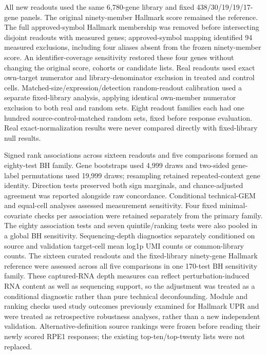 \documentclass[a4paper,fleqn]{cas-sc}
\makeatletter
\DeclareRobustCommand{\rev}[1]{{\color{red}\def\@citecolor{black}\def\@linkcolor{red}\def\@urlcolor{red}#1}}
\makeatother
\begin{document}
\rev{All new readouts used the same 6,780-gene library and fixed 438/30/19/19/17-gene panels.} \rev{The original ninety-member Hallmark score remained the reference.} \rev{The full approved-symbol Hallmark membership was removed before intersecting disjoint readouts with measured genes; approved-symbol mapping identified 94 measured exclusions, including four aliases absent from the frozen ninety-member score.} \rev{An identifier-coverage sensitivity restored these four genes without changing the original score, cohorts or candidate lists.} \rev{Real readouts used exact own-target numerator and library-denominator exclusion in treated and control cells.} \rev{Matched-size/expression/detection random-readout calibration used a separate fixed-library analysis, applying identical own-member numerator exclusion to both real and random sets.} \rev{Eight readout families each had one hundred source-control-matched random sets, fixed before response evaluation.} \rev{Real exact-normalization results were never compared directly with fixed-library null results.}

\rev{Signed rank associations across sixteen readouts and five comparisons formed an eighty-test BH family.} \rev{Gene bootstraps used 4,999 draws and two-sided gene-label permutations used 19,999 draws; resampling retained repeated-context gene identity.} \rev{Direction tests preserved both sign marginals, and chance-adjusted agreement was reported alongside raw concordance.} \rev{Conditional technical-GEM and equal-cell analyses assessed measurement sensitivity.} \rev{Four fixed minimal-covariate checks per association were retained separately from the primary family.} \rev{The eighty association tests and seven quintile/ranking tests were also pooled in a global BH sensitivity.} \rev{Sequencing-depth diagnostics separately conditioned on source and validation target-cell mean log1p UMI counts or common-library counts.} \rev{The sixteen curated readouts and the fixed-library ninety-gene Hallmark reference were assessed across all five comparisons in one 170-test BH sensitivity family.} \rev{These captured-RNA depth measures can reflect perturbation-induced RNA content as well as sequencing support, so the adjustment was treated as a conditional diagnostic rather than pure technical deconfounding.} \rev{Module and ranking checks used study outcomes previously examined for Hallmark UPR and were treated as retrospective robustness analyses, rather than a new independent validation.} \rev{Alternative-definition source rankings were frozen before reading their newly scored RPE1 responses; the existing top-ten/top-twenty lists were not replaced.}
\end{document}

